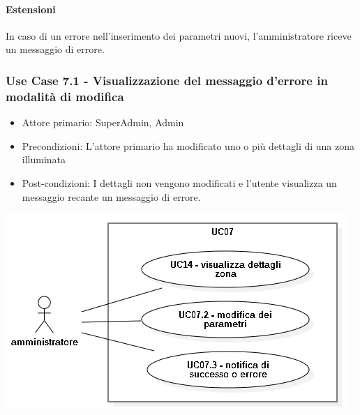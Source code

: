 \documentclass[12pt]{article}
\begin{document}
\paragraph{Estensioni} In caso di un errore nell'inserimento dei parametri nuovi, l'amministratore riceve un messaggio di errore.

\subsubsection{Use Case 7.1 - Visualizzazione del messaggio d'errore in modalità di modifica}
\begin{itemize}
	\item Attore primario: SuperAdmin, Admin
	\item Precondizioni: L'attore primario ha modificato uno o più dettagli di una zona illuminata
	\item Post-condizioni: I dettagli non vengono modificati e l'utente visualizza un messaggio recante un messaggio di errore.
\end{itemize}

\includegraphics[scale=0.5]{UC07.png}
\end{document}
